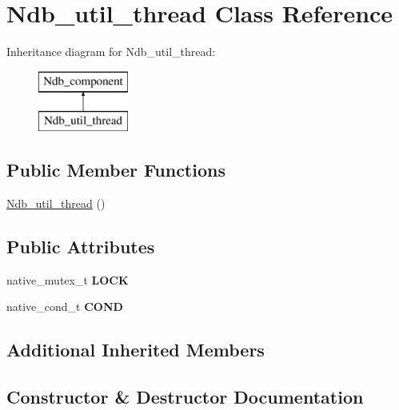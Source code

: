 \hypertarget{classNdb__util__thread}{}\section{Ndb\+\_\+util\+\_\+thread Class Reference}
\label{classNdb__util__thread}
Inheritance diagram for Ndb\+\_\+util\+\_\+thread\+:\begin{figure}[H]
\begin{center}
\leavevmode
\includegraphics[height=2.000000cm]{classNdb__util__thread}
\end{center}
\end{figure}
\subsection*{Public Member Functions}
\begin{DoxyCompactItemize}
\item 
\mbox{\hyperlink{classNdb__util__thread_a0010a104a607686a679b648e73e8ac3a}{Ndb\+\_\+util\+\_\+thread}} ()
\end{DoxyCompactItemize}
\subsection*{Public Attributes}
\begin{DoxyCompactItemize}
\item 
\mbox{\label{classNdb__util__thread_a3467bf98ec982f7c48cd80670ae658e1}} 
native\+\_\+mutex\+\_\+t {\bfseries L\+O\+CK}
\item 
\mbox{\label{classNdb__util__thread_a8b9f14427432aaec226a10a2a51a72dd}} 
native\+\_\+cond\+\_\+t {\bfseries C\+O\+ND}
\end{DoxyCompactItemize}
\subsection*{Additional Inherited Members}


\subsection{Constructor \& Destructor Documentation}
\mbox{\label{classNdb__util__thread_a0010a104a607686a679b648e73e8ac3a}} 
